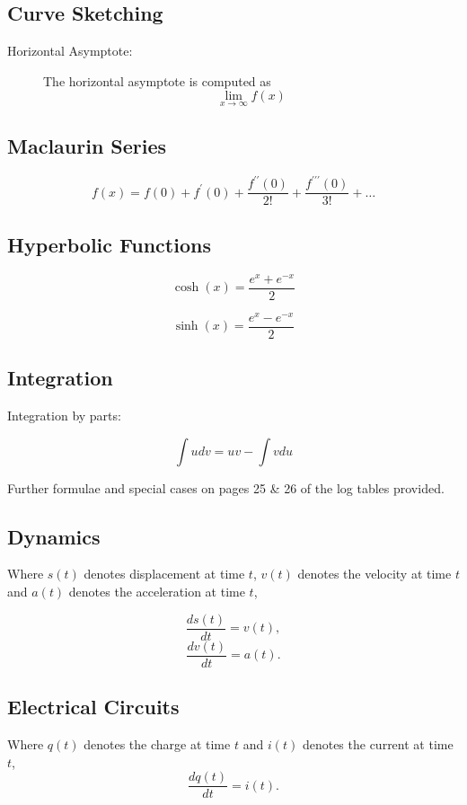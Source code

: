 	
	\subsection*{Curve Sketching}
	\begin{description}
		\item[Horizontal Asymptote:] The horizontal asymptote is computed as
		\[ \lim_{x \to \infty } f(x) \]
	\end{description}
	
	\subsection*{Maclaurin Series}
	\[f(x) = f(0) + f^{\prime}(0) + \frac{f^{\prime \prime}(0)}{2!} + \frac{f^{\prime\prime \prime}(0)}{3!} + \ldots \]
	
	\subsection*{Hyperbolic Functions }
	
	\begin{multicols}{2}
	\[ \cosh(x)  =  \frac{e^{x} + e^{-x}}{2} \]
	
	\[ \sinh(x)  = \frac{e^{x} - e^{-x}}{2} \]
	\end{multicols}

	
	

	\subsection*{Integration}
	
	Integration by parts: 
	
	\[ \int u dv = uv - \int v du \]  
	
\noindent Further formulae and special cases on pages 25 \& 26 of the log tables provided.
	
	\subsection*{Dynamics}
	Where $s(t)$ denotes displacement at time $t$, $v(t)$ denotes the velocity at time $t$ and $a(t)$
	denotes the acceleration at time $t$, 
	\begin{multicols}{2}
	\[  \frac{ds(t)}{dt}  = v(t),\]
	\[  \frac{dv(t)}{dt}  = a(t).\]
	\end{multicols}
	\subsection*{Electrical Circuits}
	Where $q(t)$ denotes the charge at time $t$ and $i(t)$ denotes the current at time $t$,
	\[  \frac{dq(t)}{dt}  = i(t).\]
	
	


